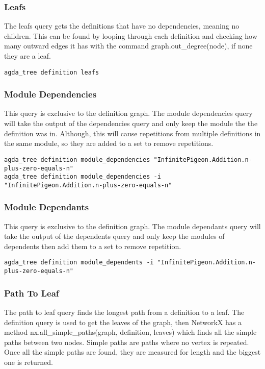 \subsubsection{Leafs}

The leafs query gets the definitions that have no dependencies, meaning no
children. This can be found by looping through each definition and checking how
many outward edges it has with the command \textsf{graph.out\_degree(node)}, if none
they are a leaf.

\begin{lstlisting}
agda_tree definition leafs
\end{lstlisting}

\subsubsection{Module Dependencies}

This query is exclusive to the definition graph. The module dependencies query
will take the output of the dependencies query and only keep the module the
the definition was in. Although, this will cause repetitions from multiple
definitions in the same module, so they are added to a set to remove
repetitions.

\begin{lstlisting}
agda_tree definition module_dependencies "InfinitePigeon.Addition.n-plus-zero-equals-n"
agda_tree definition module_dependencies -i "InfinitePigeon.Addition.n-plus-zero-equals-n"
\end{lstlisting}

\subsubsection{Module Dependants}

This query is exclusive to the definition graph. The module dependants query will take the output of the dependents query and
only keep the modules of dependents then add them to a set to remove repetition.

\begin{lstlisting}
agda_tree definition module_dependents -i "InfinitePigeon.Addition.n-plus-zero-equals-n"
\end{lstlisting}

\subsubsection{Path To Leaf}

The path to leaf query finds the longest path from a definition to a leaf. The
definition query is used to get the leaves of the graph, then NetworkX has a
method \textsf{nx.all\_simple\_paths(graph, definition, leaves)} which finds all
the simple paths between two nodes. Simple paths are paths where no vertex is
repeated. Once all the simple paths are found, they are measured for length and
the biggest one is returned.

